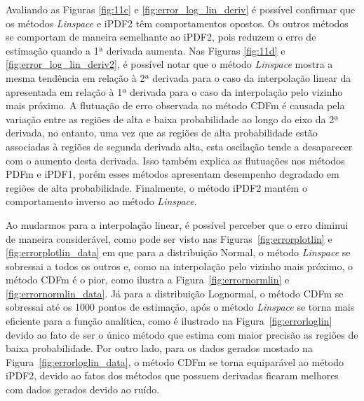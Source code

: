 Avaliando as Figuras \ref{fig:11c} e \ref{fig:error_log_lin_deriv} é possível confirmar que os métodos \textit{Linspace} e \ac{iPDF2} têm comportamentos opostos. Os outros métodos se comportam de maneira semelhante ao \ac{iPDF2}, pois reduzem o erro de estimação quando a 1ª derivada aumenta.
Nas Figuras \ref{fig:11d} e \ref{fig:error_log_lin_deriv2}, é possível notar que o método \textit{Linspace} mostra a mesma tendência em relação à 2ª derivada para o caso da interpolação linear da apresentada em relação à 1ª derivada para o caso da interpolação pelo vizinho mais próximo.
A flutuação de erro observada no método \ac{CDFm} é causada pela variação entre as regiões de alta e baixa probabilidade ao longo do eixo da 2ª derivada, no entanto, uma vez que as regiões de alta probabilidade estão associadas à regiões de segunda derivada alta, esta oscilação tende a desaparecer com o aumento desta derivada.
Isso também explica as flutuações nos métodos \ac{PDFm} e \ac{iPDF1}, porém esses métodos apresentam desempenho degradado em regiões de alta probabilidade. Finalmente, o método \ac{iPDF2} mantém o comportamento inverso ao método \textit{Linspace}.

Ao mudarmos para a interpolação linear, é possível perceber que o erro diminui de maneira considerável, como pode ser visto nas Figuras~\ref{fig:errorplotlin} e \ref{fig:errorplotlin_data} em que para a distribuição Normal, o método \textit{Linspace} se sobressai a todos os outros e, como na interpolação pelo vizinho mais próximo, o método \ac{CDFm} é o pior, como ilustra a Figura~\ref{fig:errornormlin} e \ref{fig:errornormlin_data}. Já para a distribuição Lognormal, o método \ac{CDFm} se sobressai até os 1000 pontos de estimação, após o método \textit{Linspace} se torna mais eficiente para a função analítica, como é ilustrado na Figura~\ref{fig:errorloglin} devido ao fato de ser o único método que estima com maior precisão as regiões de baixa probabilidade. Por outro lado, para os dados gerados mostado na Figura~\ref{fig:errorloglin_data}, o método \ac{CDFm} se torna equiparável ao método \ac{iPDF2}, devido ao fatos dos métodos que possuem derivadas ficaram melhores com dados gerados devido ao ruído.

